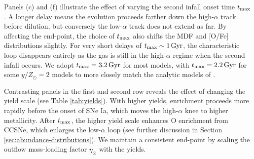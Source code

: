 \documentclass[twocolumn,twocolappendix]{aastex701}
\newcommand{\yZ}[1]{$y/Z_\odot=#1$}
\newcommand{\Gyr}{\,{\rm Gyr}}
\begin{document}
Panels (c) and (f) illustrate the effect of varying the second infall onset time $t_{\rm max}$. A longer delay means the evolution proceeds farther down the high-$\alpha$ track before dilution, but conversely the low-$\alpha$ track does not extend as far. By affecting the end-point, the choice of $t_{\rm max}$ also shifts the MDF and [O/Fe] distributions slightly. For very short delays of $t_{\rm max}\sim1\Gyr$, the characteristic loop disappears entirely as the gas is still in the high-$\alpha$ regime when the second infall occurs. We adopt $t_{\rm max}=3.2\Gyr$ for most models, with $t_{\rm max}=2.2\Gyr$ for some \yZ{2} models to more closely match the analytic models of \citet{palicio_analytic_2023}.

Contrasting panels in the first and second row reveals the effect of changing the yield scale (see Table \ref{tab:yields}). With higher yields, enrichment proceeds more rapidly before the onset of SNe Ia, which moves the high-$\alpha$ knee to higher metallicity. After $t_{\rm max}$, the higher yield scale enhances O enrichment from CCSNe, which enlarges the low-$\alpha$ loop (see further discussion in Section \ref{sec:abundance-distributions}). We maintain a consistent end-point by scaling the outflow mass-loading factor $\eta_\odot$ with the yields.



\end{document}
